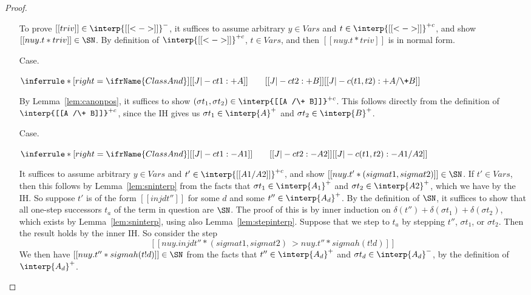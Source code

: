 \begin{proof}
\begin{itemize}
To prove $[[triv]]\in\interp{[[<->]]}^{-}$, it suffices to assume
arbitrary $y\in\textit{Vars}$ and $t\in\interp{[[<->]]}^{+c}$, and
show $[[nu y . t * triv]]\in\SN$.  By definition of
$\interp{[[<->]]}^{+c}$, $t\in\textit{Vars}$, and then $[[nu y . t *
triv]]$ is in normal form.

\item[Case.]\ 

\vspace{-.2cm}
\begin{center}
\begin{math}
\inferrule* [right=\ifrName{ClassAnd}] {[[J |-c t1 : + A]] \qquad [[J |-c t2 : + B]]}{[[J |-c (t1,t2) : + A /\+ B]]}
\end{math}
\end{center}

By Lemma~\ref{lem:canonpos}, it suffices to show $(\sigma t_1,\sigma
t_2)\in\interp{[[A /\+ B]]}^{+c}$.  This follows directly from the
definition of $\interp{[[A /\+ B]]}^{+c}$, since the IH gives us
$\sigma t_1\in\interp{A}^+$ and $\sigma t_2\in\interp{B}^+$.

\item[Case.]\ 

\vspace{-.2cm}
\begin{center}
\begin{math}
\inferrule* [right=\ifrName{ClassAnd}] {[[J |-c t1 : - A1]] \qquad [[J |-c t2 : - A2]]}{[[J |-c (t1,t2) : - A1 /\- A2]]}
\end{math}
\end{center}

It suffices to assume arbitrary $y\in\textit{Vars}$ and
$t'\in\interp{[[A1 /\- A2]]}^{+c}$, and show $[[nu y . t' * (sigma t1
, sigma t2)]]\in\SN$.  If $t'\in\textit{Vars}$, then this follows by
Lemma~\ref{lem:sninterp} from the facts that $\sigma
t_1\in\interp{A_1}^+$ and $\sigma t_2\in\interp{A2}^+$, which we have
by the IH.  So suppose $t'$ is of the form $[[inj d t'']]$ for some
$d$ and some $t''\in\interp{A_d}^+$.  By the definition of $\SN$, it
suffices to show that all one-step successors $t_a$ of the term in
question are $\SN$.  The proof of this is by inner induction on
$\delta(t'') + \delta(\sigma t_1) + \delta(\sigma t_2)$, which exists
by Lemma~\ref{lem:sninterp}, using also Lemma~\ref{lem:stepinterp}.
Suppose that we step to $t_a$ by stepping $t''$, $\sigma t_1$, or
$\sigma t_2$.  Then the result holds by the inner IH.  So consider the
step
\[
[[nu y . inj d t'' * (sigma t1, sigma t2) ~> nu y . t'' * sigma h(t ! d)]]
\]
We then have $[[nu y . t'' * sigma h(t ! d)]]\in\SN$ from the facts
that $t''\in\interp{A_d}^+$ and $\sigma t_d\in\interp{A_d}^-$, by
the definition of $\interp{A_d}^+$.


\end{itemize}
\end{proof}
